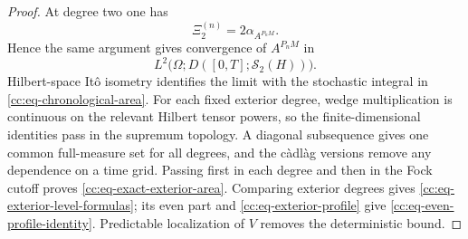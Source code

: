 \documentclass[10pt,a4paper]{amsart}
\begin{document}
\begin{proof}
At degree two one has
\[
 \Xi_2^{(n)}=2\alpha_{A^{P_nM}}.
\]
Hence the same argument gives convergence of $A^{P_nM}$ in
\[
 L^2\bigl(\Omega;D([0,T];\mathcal S_2(H))\bigr).
\]
Hilbert-space It\^o isometry identifies the limit with the stochastic
integral in \eqref{cc:eq-chronological-area}.  For each fixed exterior
degree, wedge multiplication is continuous on the relevant Hilbert tensor
powers, so the finite-dimensional identities pass in the supremum topology.
A diagonal subsequence gives one common full-measure set for all degrees,
and the c\`adl\`ag versions remove any dependence on a time grid.  Passing
first in each degree and then in the Fock cutoff proves
\eqref{cc:eq-exact-exterior-area}.  Comparing exterior degrees gives
\eqref{cc:eq-exterior-level-formulas}; its even part and
\eqref{cc:eq-exterior-profile} give
\eqref{cc:eq-even-profile-identity}.  Predictable localization of \(V\)
removes the deterministic bound.
\end{proof}
\end{document}
